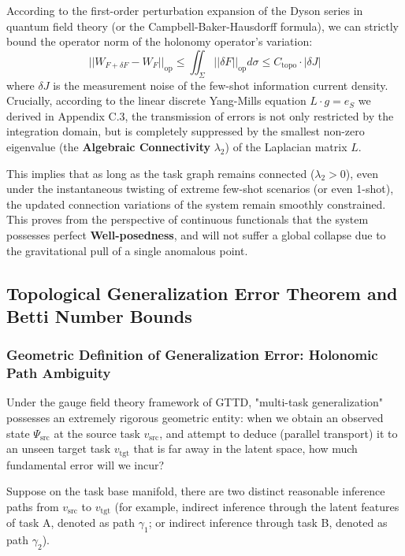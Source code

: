 \documentclass{article}
\begin{document}
According to the first-order perturbation expansion of the Dyson series in quantum field theory (or the Campbell-Baker-Hausdorff formula), we can strictly bound the operator norm of the holonomy operator's variation:
\begin{equation}
||W_{F+\delta F} - W_F||_{\text{op}} \leq \iint_\Sigma ||\delta F||_{\text{op}} d\sigma \leq C_{\text{topo}} \cdot |\delta J|
\end{equation}
where $\delta J$ is the measurement noise of the few-shot information current density. Crucially, according to the linear discrete Yang-Mills equation $L \cdot g = e_S$ we derived in Appendix C.3, the transmission of errors is not only restricted by the integration domain, but is completely suppressed by the smallest non-zero eigenvalue (the \textbf{Algebraic Connectivity} $\lambda_2$) of the Laplacian matrix $L$.

This implies that as long as the task graph remains connected ($\lambda_2 > 0$), even under the instantaneous twisting of extreme few-shot scenarios (or even 1-shot), the updated connection variations of the system remain smoothly constrained. This proves from the perspective of continuous functionals that the system possesses perfect \textbf{Well-posedness}, and will not suffer a global collapse due to the gravitational pull of a single anomalous point.

\subsection{Topological Generalization Error Theorem and Betti Number Bounds}

\subsubsection{Geometric Definition of Generalization Error: Holonomic Path Ambiguity}

Under the gauge field theory framework of GTTD, "multi-task generalization" possesses an extremely rigorous geometric entity: when we obtain an observed state $\Psi_{\text{src}}$ at the source task $v_{\text{src}}$, and attempt to deduce (parallel transport) it to an unseen target task $v_{\text{tgt}}$ that is far away in the latent space, how much fundamental error will we incur?

Suppose on the task base manifold, there are two distinct reasonable inference paths from $v_{\text{src}}$ to $v_{\text{tgt}}$ (for example, indirect inference through the latent features of task A, denoted as path $\gamma_1$; or indirect inference through task B, denoted as path $\gamma_2$).
\end{document}
